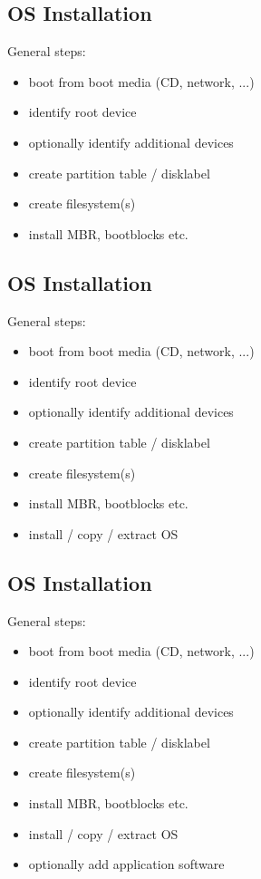 \documentclass[xga]{xdvislides}
\begin{document}
\subsection{OS Installation}
General steps:
\begin{itemize}
	\item boot from boot media (CD, network, ...)
	\item identify root device
	\item optionally identify additional devices
	\item create partition table / disklabel
	\item create filesystem(s)
	\item install MBR, bootblocks etc.
\end{itemize}

\subsection{OS Installation}
General steps:
\begin{itemize}
	\item boot from boot media (CD, network, ...)
	\item identify root device
	\item optionally identify additional devices
	\item create partition table / disklabel
	\item create filesystem(s)
	\item install MBR, bootblocks etc.
	\item install / copy / extract OS
\end{itemize}

\subsection{OS Installation}
General steps:
\begin{itemize}
	\item boot from boot media (CD, network, ...)
	\item identify root device
	\item optionally identify additional devices
	\item create partition table / disklabel
	\item create filesystem(s)
	\item install MBR, bootblocks etc.
	\item install / copy / extract OS
	\item optionally add application software
\end{itemize}
\end{document}

